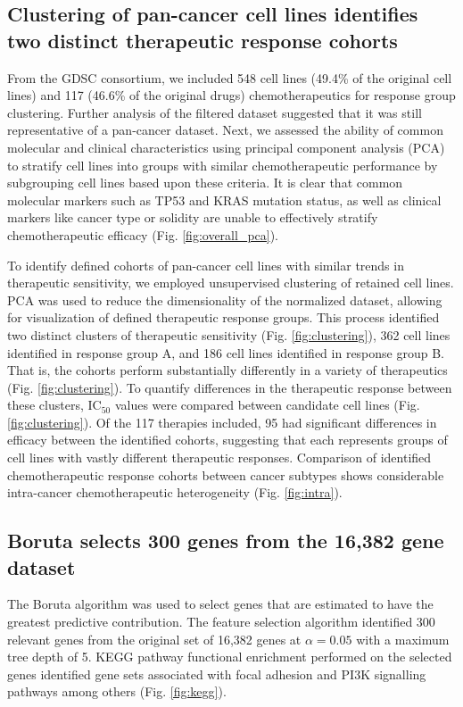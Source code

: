 \documentclass[10pt, letterpaper, twocolumn]{article}
\begin{document}
\subsection{Clustering of pan-cancer cell lines identifies two distinct therapeutic response cohorts}
From the GDSC consortium, we included 548 cell lines (49.4\% of the original cell lines) and 117 (46.6\% of the original drugs) chemotherapeutics for response group clustering. Further analysis of the filtered dataset suggested that it was still representative of a pan-cancer dataset. Next, we assessed the ability of common molecular and clinical characteristics using principal component analysis (PCA) to stratify cell lines into groups with similar chemotherapeutic performance by subgrouping cell lines based upon these criteria. It is clear that common molecular markers such as TP53 and  KRAS mutation status, as well as clinical markers like cancer type or solidity are unable to effectively stratify chemotherapeutic efficacy (Fig. \ref{fig:overall_pca}).

To identify defined cohorts of pan-cancer cell lines with similar trends in therapeutic sensitivity, we employed unsupervised clustering of retained cell lines. PCA was used to reduce the dimensionality of the normalized dataset, allowing for visualization of defined therapeutic response groups. This process identified two distinct clusters of therapeutic sensitivity (Fig. \ref{fig:clustering}), 362 cell lines identified in response group A, and 186 cell lines identified in response group B. That is, the cohorts perform substantially differently in a variety of therapeutics (Fig. \ref{fig:clustering}). To quantify differences in the therapeutic response between these clusters, IC$_{50}$ values were compared between candidate cell lines (Fig. \ref{fig:clustering}). Of the 117 therapies included, 95 had significant differences in efficacy between the identified cohorts, suggesting that each represents groups of cell lines with vastly different therapeutic responses. Comparison of identified chemotherapeutic response cohorts between cancer subtypes shows considerable intra-cancer chemotherapeutic heterogeneity (Fig. \ref{fig:intra}).


\subsection{Boruta selects 300 genes from the 16,382 gene dataset}
The Boruta algorithm was used to select genes that are estimated to have the greatest predictive contribution. The feature selection algorithm identified 300 relevant genes from the original set of 16,382 genes at $\alpha=0.05$ with a maximum tree depth of 5. KEGG pathway functional enrichment performed on the selected genes identified gene sets associated with focal adhesion and PI3K signalling pathways among others (Fig. \ref{fig:kegg}).
\end{document}
